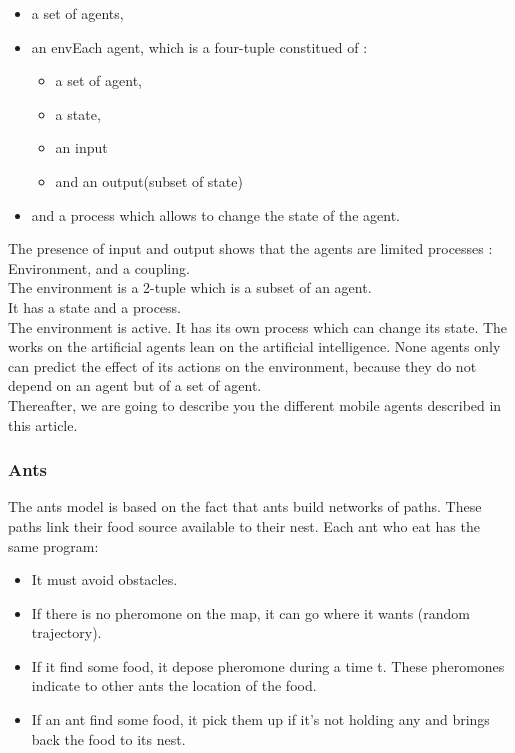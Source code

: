 \begin{itemize}
\item a set of agents,
\item an envEach agent, which is a four-tuple constitued of : 
\begin{itemize}
\item a set of agent,
\item a state, 
\item an input 
\item and an output(subset of state)
\end{itemize}
\item and a process which allows to change the state of the agent.
\end{itemize}

The presence of input and output shows that the agents are limited processes : Environment, and a coupling.\\
The environment is a 2-tuple which is a subset of an agent.\\
It has a state and a process.\\ 
The environment is active. It has its own process which can change its state. The works on the artificial agents lean on the artificial intelligence. None agents only can predict the effect of its actions on the environment, because they do not depend on an agent but of a set of agent.\\
Thereafter, we are going to describe you the different mobile agents described in this article.

\newpage

\subsubsection{Ants}

The ants model is based on the fact that ants build networks of paths. These paths link their food source available to their nest.
Each ant who eat has the same program:

\begin{itemize}
\item It must avoid obstacles.
\item If there is no pheromone on the map, it can go where it wants (random trajectory).
\item If it find some food, it depose pheromone during a time t. These pheromones indicate to other ants the location of the food.
\item If an ant find some food, it pick them up if it's not holding any and brings back the food to its nest.
\end{itemize}

